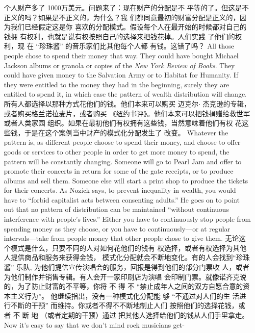 \begin{paracol}{2}
个人财产多了 1000万美元。问题来了：现在财产的分配是不
平等的了。但这是不正义的吗？如果是不正义的，为什么？我
们都同意最初的财富分配是正义的，因为我们已经假定这是你
喜欢的分配模式。假设每个人在最开始的时候都对自己的钱拥
有权利，也就是说有权按照自己的选择来把钱花掉。人们实践
了他们的权利，现 在 “珍珠酱” 的音乐家们比其他每个人都
有钱。这错了吗？
\switchcolumn*
All those people chose to spend their money that way. They
could have bought Michael Jackson albums or granola or copies
of the \textit{New York Review of Books}. They could have given money to the Salvation Army or to Habitat for Humanity. If they were
entitled to the money they had in the beginning, surely they are
entitled to spend it, in which case the pattern of wealth distribution will change.
\switchcolumn
所有人都选择以那种方式花他们的钱。他们本来可以购买
迈克尔$\cdot$ 杰克逊的专辑，或者购买格兰诺拉麦片，或者购买
《纽约书评》。他们本来可以把钱捐赠给救世军或者人类家园
组织。如果在最初他们有权拥有这些钱，当然意味着他们有权
花这些钱，于是在这个案例当中财产的模式化分配发生了
改变。
\switchcolumn*
Whatever the pattern is, as different people choose to spend
their money, and choose to offer goods or services to other people in order to get more money to spend, the pattern will be
constantly changing. Someone will go to Pearl Jam and offer to
promote their concerts in return for some of the gate receipts,
or to produce albums and sell them. Someone else will start a
print shop to produce the tickets for their concerts. As Nozick
says, to prevent inequality in wealth, you would have to ``forbid
capitalist acts between consenting adults.'' He goes on to point
out that no pattern of distribution can be maintained ``without
continuous interference with people's lives.'' Either you have to
continuously stop people from spending money as they choose,
or you have to continuously---or at regular intervals---take
from people money that other people chose to give them.
\switchcolumn
无论这个模式是什么，只要不同的人对如何花他们的钱有
权选择，或者有权选择为其他人提供商品和服务来获得金钱，
模式化分配就会不断地变化。有的人会找到“珍珠酱” 乐队,
为他们提供宣传演唱会的服务，回报是得到他们的部分门票收
人，或者为他们制作并销售专辑。有人会开一家印刷店为演唱
会印制门票。就像诺齐克说的，为了防止财富的不平等，你将
不 得 不 “禁止成年人之间的双方自愿合意的资本主义行为”。
他继续指出，没有一种模式化分配能 够 “不通过对人们的生
活进行不断的干预” 而维持。你或者不得不不断地制止人们
按照他们的选择花钱，或 者 不 断 地 （或者定期的干预）通过
把其他人选择给他们的钱从人们手里拿走。
\switchcolumn*
Now it's easy to say that we don't mind rock musicians get-

\end{paracol}
